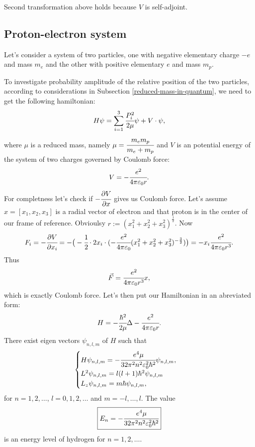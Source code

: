 \documentclass[main.tex]{subfiles}
\begin{document}
Second transformation above holds because $V$ is self-adjoint.

\subsection{Proton-electron system}
Let's consider a system of two particles, one with negative elementary charge $-e$ and mass $m_e$ and the other with positive elementary $e$ and mass $m_p$.

To investigate probability amplitude of the relative position of the two particles, according to considerations in Subsection \ref{reduced-mass-in-quantum}, we need to get the following hamiltonian:
\begin{equation}
H \psi = \sum_{i=1}^3 \cfrac{P^2_i}{2\mu}\psi + V\cdot\psi, 
\end{equation}
where $\mu$ is a reduced mass, namely $\mu = \cfrac{m_e m_p}{m_e + m_p}$ and $V$ is an potential energy of the system of two charges governed by Coulomb force:
\begin{equation}
V = - \cfrac{e^2}{4\pi\epsilon_0 r}.
\end{equation} 
For completness let's check if $-\cfrac{\partial V}{\partial x}$ gives us Coulomb force. Let's assume $x=[x_1, x_2, x_3]$ is a radial vector of electron and that proton is in the center of our frame of reference. Obvioulsy $r:=(x_1^2 + x_2^2 + x_3^2)^{\frac{1}{2}}$. Now
\begin{equation}
F_i = -\cfrac{\partial V}{\partial x_i} = -\big(-\cfrac{1}{2}\cdot 2x_i \cdot (-\cfrac{e^2}{4\pi\epsilon_0}(x_1^2 + x_2^2 + x_3^2)^{-\frac{3}{2}})\big) = -x_i \cfrac{e^2}{4\pi\epsilon_0 r^3}.
\end{equation}
Thus
\begin{equation}
\vec{F} = \cfrac{e^2}{4\pi\epsilon_0 r^3}x,
\end{equation}
which is exactly Coulomb force.
Let's then put our Hamiltonian in an abreviated form:
\begin{equation}
H = -\cfrac{\hbar^2}{2\mu}\Delta - \cfrac{e^2}{4\pi\epsilon_0 r}.
\end{equation}
There exist eigen vectors $\psi_{n,l,m}$ of $H$ such that
\begin{equation}
\begin{cases}
H\psi_{n,l,m} = -\cfrac{e^4 \mu }{32 \pi ^2 n^2 \epsilon_0^2 \hbar ^2}\psi_{n,l,m},\\
L^2 \psi_{n,l,m} = l(l+1)\hbar^2 \psi_{n,l,m}\\
L_z \psi_{n,l,m} = m\hbar \psi_{n,l,m},
\end{cases}
\end{equation}
for $n=1,2, \dots$, $l=0, 1, 2, \dots$ and $m=-l, \dots, l$.
The value
\begin{equation}
\boxed{
E_n = -\cfrac{e^4 \mu }{32 \pi ^2 n^2 \epsilon_0^2 \hbar ^2}
} 
\end{equation} 
is an energy level of hydrogen for $n=1,2,\dots$.
\end{document}
